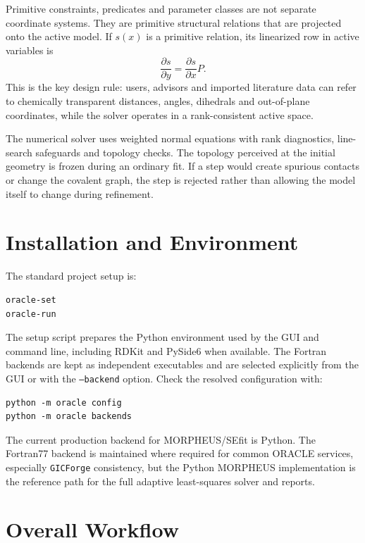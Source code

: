 \documentclass[11pt]{article}
\newcommand{\gicforge}{\texttt{GICForge}}
\begin{document}
Primitive constraints, predicates and parameter classes are not separate
coordinate systems.  They are primitive structural relations that are projected
onto the active model.  If \(s(x)\) is a primitive relation, its linearized row
in active variables is
\[
  \frac{\partial s}{\partial y}
  =
  \frac{\partial s}{\partial x}P .
\]
This is the key design rule: users, advisors and imported literature data can
refer to chemically transparent distances, angles, dihedrals and out-of-plane
coordinates, while the solver operates in a rank-consistent active space.

The numerical solver uses weighted normal equations with rank diagnostics,
line-search safeguards and topology checks.  The topology perceived at the
initial geometry is frozen during an ordinary fit.  If a step would create
spurious contacts or change the covalent graph, the step is rejected rather
than allowing the model itself to change during refinement.

\section{Installation and Environment}

The standard project setup is:

\begin{lstlisting}[style=oracle]
oracle-set
oracle-run
\end{lstlisting}

\noindent
The setup script prepares the Python environment used by the GUI and command
line, including RDKit and PySide6 when available.  The Fortran backends are
kept as independent executables and are selected explicitly from the GUI or
with the \texttt{--backend} option.  Check the resolved configuration with:

\begin{lstlisting}[style=oracle]
python -m oracle config
python -m oracle backends
\end{lstlisting}

\noindent
The current production backend for MORPHEUS/SEfit is Python.  The Fortran77 backend
is maintained where required for common ORACLE services, especially
\gicforge{} consistency, but the Python MORPHEUS implementation is the
reference path for the full adaptive least-squares solver and reports.

\section{Overall Workflow}
\end{document}
